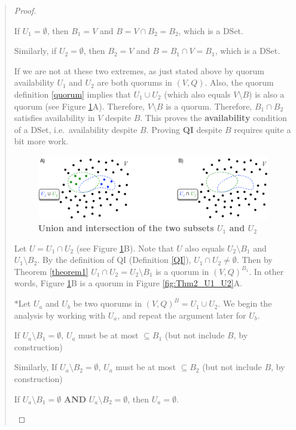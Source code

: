 \begin{quote}
\begin{proof}
\begin{case}
If $U_1 = \emptyset$, then $B_1 = V$ and $B = V \cap B_2 = B_2$, which is a DSet.
\end{case}
\begin{case}
Similarly, if $U_2 = \emptyset$, then $B_2 = V$ and $B = B_1 \cap V = B_1$, which is a DSet.
\end{case}
\begin{case}
If we are not at these two extremes, as just stated above by quorum availability $U_1$ and $U_2$ are both quorums in $(V, Q)$. Also, the quorum definition \ref{quorum} implies that $U_1 \cup U_2$ (which also equals $V \setminus B$) is also a quorum (see Figure \ref{fig:Thm2_U1_U_U2}A). Therefore, $V \setminus B$ is a quorum. Therefore, $B_1 \cap B_2$ satisfies availability in $V$ despite $B$. This proves the {\bf availability} condition of a DSet, i.e.\ availability despite $B$. Proving {\bf QI} despite $B$ requires quite a bit more work.

\begin{figure}[h]
\centering
\includegraphics[width=16 cm]{Figures/Thm2_U1_U_U2}
\caption{\bf \small Union and intersection of the two subsets $U_1$ and $U_2$}
\label{fig:Thm2_U1_U_U2}
\end{figure}

Let $U = U_1 \cap U_2$ (see Figure \ref{fig:Thm2_U1_U_U2}B). Note that $U$ also equals $U_2 \setminus B_1$  and $U_1 \setminus B_2$. By the definition of QI (Definition \ref{QI}), $U_1 \cap U_2 \ne \emptyset$. Then by Theorem \ref{theorem1} $U_1 \cap U_2 = U_2 \setminus B_1$ is a quorum in $(V, Q)^{B_1}$. In other words, Figure \ref{fig:Thm2_U1_U_U2}B is a quorum in Figure \ref{fig:Thm2_U1_U2}A.

\vspace{0.3cm}
$*$Let $U_a$ and $U_b$ be two quorums in $(V, Q)^B = U_1 \cup U_2$. We begin the analysis by working with $U_a$, and repeat the argument later for $U_b$.
\vspace{0.3cm}
\begin{packed_item1}
\item If $U_a \setminus B_1 = \emptyset$, $U_a$ must be at most $\subseteq B_1$ (but not include $B$, by construction)
\item Similarly, If $U_a \setminus B_2 = \emptyset$, $U_a$ must be at most $\subseteq B_2$ (but not include $B$, by construction)
\item If $U_a \setminus B_1 = \emptyset$ {\bf AND} $U_a \setminus B_2 = \emptyset$, then $U_a = \emptyset$.
\end{packed_item1}
\vspace{0.3cm}


\end{case}
\end{proof}
\end{quote}
